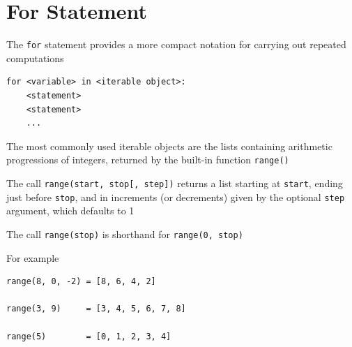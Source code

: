 \documentclass[8pt,a4paper,compress]{beamer}
\begin{document}
\section{For Statement}
\begin{frame}[fragile]
\pause

The \lstinline{for} statement provides a more compact notation for carrying out repeated computations

\pause
\smallskip

\begin{lstlisting}[language={}]
for <variable> in <iterable object>:
    <statement>
    <statement>
    ...
\end{lstlisting}

\pause
\bigskip

The most commonly used iterable objects are the lists containing arithmetic progressions of integers, returned by the built-in function \lstinline{range()}

\pause
\bigskip

The call \lstinline{range(start, stop[, step])} returns a list starting at \lstinline{start}, ending just before \lstinline{stop}, and in increments (or decrements) given by the optional \lstinline{step} argument, which defaults to 1

\pause
\bigskip

The call \lstinline{range(stop)} is shorthand for \lstinline{range(0, stop)}

\pause
\bigskip

For example
\begin{lstlisting}[language={}]
range(8, 0, -2) = [8, 6, 4, 2]

range(3, 9)     = [3, 4, 5, 6, 7, 8]

range(5)        = [0, 1, 2, 3, 4]
\end{lstlisting}
\end{frame}
\end{document}
